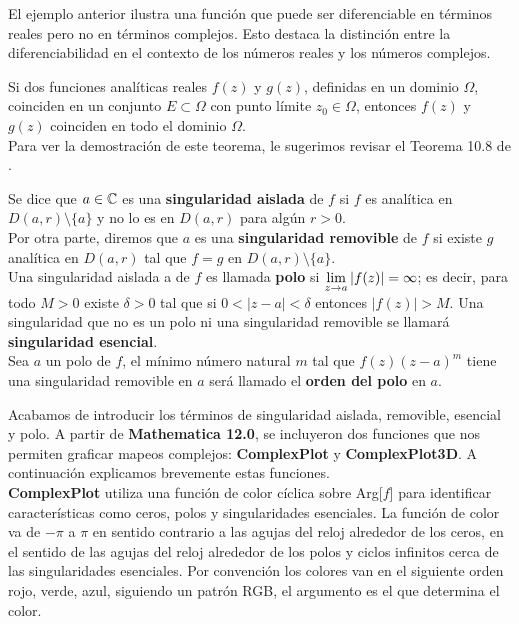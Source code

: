 El ejemplo anterior ilustra una función que puede ser diferenciable en términos reales pero no en términos complejos. Esto destaca la distinción entre la diferenciabilidad en el contexto de los números reales y los números complejos.
\begin{teor}\label{TIFA}
	Si dos funciones analíticas reales $f(z)$ y $g(z)$, definidas en un dominio $\Omega$,
	coinciden en un conjunto $E \subset \Omega$ con punto límite $z_0 \in \Omega$, entonces $f(z)$ y $g(z)$ coinciden en todo el dominio $\Omega$.\\
	Para ver la demostración de este teorema, le sugerimos revisar el Teorema 10.8 de \cite{silverman}.
\end{teor} 
\begin{defi}
	Se dice que $a\in \mathbb{C}$ es una \textbf{singularidad aislada} de $f$ si $f$ es analítica en $D(a,r)\setminus\{a\}$ y no lo es en $D(a,r)$ para algún $r>0$.\\Por otra parte, diremos que $a$ es una \textbf{singularidad removible} de $f$ si existe $g$ analítica en $D(a,r)$ tal que $f=g$ en $D(a,r)\setminus\{a\}$.\\Una singularidad aislada a de $f$ es llamada \textbf{polo} si $\displaystyle\lim_{z\rightarrow a}|f(z)|=\infty$; es decir, para todo $M>0$ existe $\delta>0$ tal que si $0<|z-a|<\delta$ entonces $|f(z)|>M$. Una singularidad que no es un polo ni una singularidad removible se llamará
	\textbf{singularidad esencial}.\\Sea $a$ un polo de $f$, el mínimo número natural $m$ tal que $f(z)(z-a)^m$ tiene una singularidad removible en $a$ será llamado el \textbf{orden del polo} en $a$.
\end{defi}
Acabamos de introducir los términos de singularidad aislada, removible, esencial y polo.  A partir de \textbf{Mathematica 12.0}, se incluyeron dos funciones que  nos permiten graficar mapeos complejos:  \textbf{ComplexPlot} y \textbf{ComplexPlot3D}. A continuación explicamos brevemente estas funciones.\\
\textbf{ComplexPlot} utiliza una función de color cíclica sobre Arg[$f$] para identificar características como ceros, polos y singularidades esenciales. La función de color va de $-\pi$ a $\pi$ en sentido contrario a las agujas del reloj alrededor de los ceros, en el sentido de las agujas del reloj alrededor de los polos y ciclos infinitos cerca de las singularidades esenciales. Por convención los colores van en el siguiente orden rojo, verde, azul, siguiendo un patrón RGB, el argumento es el que determina el color.
